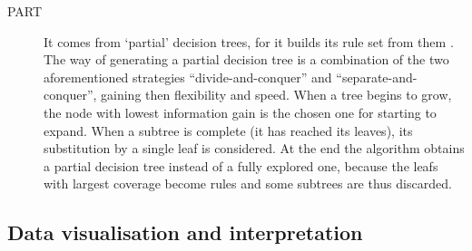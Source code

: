 \begin{description}
   \item[PART] It comes from `partial' decision trees, for it builds its rule set from them \cite{Frank1998}. The way of generating a partial decision tree is a combination of the two aforementioned strategies ``divide-and-conquer'' and ``separate-and-conquer'', gaining then flexibility and speed. When a tree begins to grow, the node with lowest information gain is the chosen one for starting to expand. When a subtree is complete (it has reached its leaves), its substitution by a single leaf is considered. At the end the algorithm obtains a partial decision tree instead of a fully explored one, because the leafs with largest coverage become rules and some subtrees are thus discarded.
 \end{description} 

\subsection{Data visualisation and interpretation}
